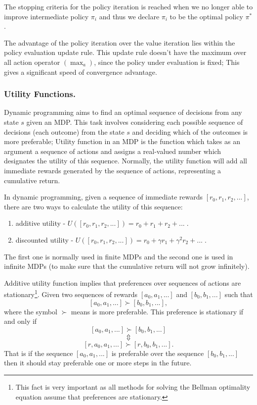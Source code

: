 The stopping criteria for the policy iteration is reached when we no longer able to improve intermediate policy $ \pi_{i} $ and thus we declare $ \pi_{i} $ to be the optimal policy $\pi^{*}$.

The advantage of the policy iteration over the value iteration lies within the policy evaluation update rule. This update rule doesn't have the maximum over all action operator $(\max_{a})$, since the policy under evaluation is fixed; This gives a significant speed of convergence advantage.

\subsubsection{Utility Functions.}
Dynamic programming aims to find an optimal sequence of decisions from any state $s$ given an MDP. This task involves considering each possible sequence of decisions (each outcome) from the state $s$ and deciding which of the outcomes is more preferable; Utility function in an MDP is the function which takes as an argument a sequence of actions and assigns a real-valued number which designates the utility of this sequence. Normally, the utility function will add all immediate rewards generated by the sequence of actions, representing a cumulative return.

In dynamic programming, given a sequence of immediate rewards $[r_{0},r_{1},r_{2},...]$, there are two ways to calculate the utility of this sequence:
\begin{enumerate}
  \item additive utility - $U([r_{0},r_{1},r_{2},...])=r_{0}+r_{1}+r_{2}+...\;$.
  \item discounted utility - $U([r_{0},r_{1},r_{2},...])=r_{0}+\gamma r_{1}+\gamma^{2} r_{2}+...\;$.
\end{enumerate}
The first one is normally used in finite MDPs and the second one is used in infinite MDPs (to make sure that the cumulative return will not grow infinitely).

Additive utility function implies that preferences over sequences of actions are stationary\footnote{This fact is very important as all methods for solving the Bellman optimality equation assume that preferences are stationary.}. Given two sequences of rewards $[a_{0},a_{1},...]$ and $[b_{0},b_{1},...]$ such that
$$ [a_{0},a_{1},...] \succ [b_{0},b_{1},...], $$
where the symbol $\succ$ means is more preferable. This preference is stationary if and only if
$$ [a_{0},a_{1},...] \succ [b_{0},b_{1},...] $$
$$ \Updownarrow $$
$$ [r,a_{0},a_{1},...] \succ [r,b_{0},b_{1},...]. $$
That is if the sequence $[a_{0},a_{1},...]$ is preferable over the sequence $[b_{0},b_{1},...]$ then it should stay preferable one or more steps in the future.

